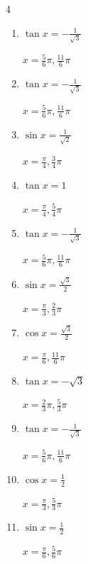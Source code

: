 \begin{multicols}{4}
\begin{enumerate}
        $\displaystyle x = \frac{2}{3}\pi , \frac{5}{3}\pi$

  \item $\displaystyle \tan{x}  = -\frac{1}{\sqrt{3}}$

        $\displaystyle x = \frac{5}{6}\pi , \frac{11}{6}\pi$

  \item $\displaystyle \tan{x}  = -\frac{1}{\sqrt{3}}$

        $\displaystyle x = \frac{5}{6}\pi , \frac{11}{6}\pi$

  \item $\displaystyle \sin{x}  = \frac{1}{\sqrt{2}}$

        $\displaystyle x = \frac{\pi}{4} , \frac{3}{4}\pi$

  \item $\displaystyle \tan{x}  = 1$

        $\displaystyle x = \frac{\pi}{4} , \frac{5}{4}\pi$

  \item $\displaystyle \tan{x}  = -\frac{1}{\sqrt{3}}$

        $\displaystyle x = \frac{5}{6}\pi , \frac{11}{6}\pi$

  \item $\displaystyle \sin{x}  = \frac{\sqrt{3}}{2}$

        $\displaystyle x = \frac{\pi}{3} , \frac{2}{3}\pi$

  \item $\displaystyle \cos{x}  = \frac{\sqrt{3}}{2}$

        $\displaystyle x = \frac{\pi}{6} , \frac{11}{6}\pi$

  \item $\displaystyle \tan{x}  = -\sqrt{3}$

        $\displaystyle x = \frac{2}{3}\pi , \frac{5}{3}\pi$

  \item $\displaystyle \tan{x}  = -\frac{1}{\sqrt{3}}$

        $\displaystyle x = \frac{5}{6}\pi , \frac{11}{6}\pi$

  \item $\displaystyle \cos{x}  = \frac{1}{2}$

        $\displaystyle x = \frac{\pi}{3} , \frac{5}{3}\pi$

  \item $\displaystyle \sin{x}  = \frac{1}{2}$

        $\displaystyle x = \frac{\pi}{6} , \frac{5}{6}\pi$


\end{enumerate}
\end{multicols}
